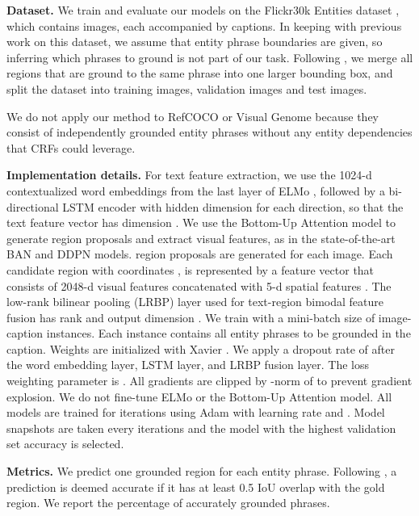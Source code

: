 \documentclass[11pt,a4paper]{article}
\newcommand{\smallsection}[1]{{\noindent\textbf{#1.}}}
\begin{document}
\smallsection{Dataset} We train and evaluate our models on the Flickr30k Entities dataset \cite{DBLP:journals/ijcv/PlummerWCCHL17}, which contains  images, each accompanied by  captions. In keeping with previous work on this dataset, we assume that entity phrase boundaries are given, so inferring which phrases to ground is not part of our task. Following \citet{DBLP:journals/ijcv/PlummerWCCHL17}, we merge all regions that are ground to the same phrase into one larger bounding box, and split the dataset into  training images,  validation images and  test images. 

We do not apply our method to RefCOCO \cite{DBLP:conf/eccv/YuPYBB16} or Visual Genome \cite{DBLP:journals/ijcv/KrishnaZGJHKCKL17} because they consist of independently grounded entity phrases without any entity dependencies that CRFs could leverage. 

\smallsection{Implementation details} For text feature extraction, we use the 1024-d contextualized word embeddings from the last layer of ELMo \cite{DBLP:conf/naacl/PetersNIGCLZ18}, followed by a bi-directional LSTM \cite{DBLP:journals/neco/HochreiterS97} encoder with hidden dimension  for each direction, so that the text feature vector has dimension . We use the Bottom-Up Attention model \cite{DBLP:conf/cvpr/00010BT0GZ18} to generate region proposals and extract visual features, as in the state-of-the-art BAN \cite{DBLP:conf/nips/KimJZ18} and DDPN \cite{DBLP:conf/ijcai/YuYXZ0T18} models.  region proposals are generated for each image. Each candidate region with coordinates ,   is represented by a  feature vector that consists of 2048-d visual features concatenated with 5-d spatial features . The low-rank bilinear pooling (LRBP) layer used for text-region bimodal feature fusion  has rank  and output dimension . We train with a mini-batch size of  image-caption instances. Each instance contains all entity phrases to be grounded in the caption. Weights  are initialized with  Xavier  \cite{DBLP:journals/jmlr/GlorotB10}. We apply a dropout rate of  after the word embedding layer, LSTM layer, and LRBP fusion layer. The loss weighting parameter  is . All gradients are clipped by -norm of  to prevent gradient explosion. We do not fine-tune ELMo or the Bottom-Up Attention model. All models are trained for  iterations using  Adam  \cite{DBLP:journals/corr/KingmaB14} with learning rate  and . Model snapshots are taken every  iterations and the model with the highest validation set accuracy is selected. 

\smallsection{Metrics} We predict one grounded region for each entity phrase. Following \citet{DBLP:journals/ijcv/PlummerWCCHL17}, a prediction is deemed accurate if it has at least 0.5 IoU overlap with the gold region. We report the percentage of accurately grounded phrases. 
\end{document}
